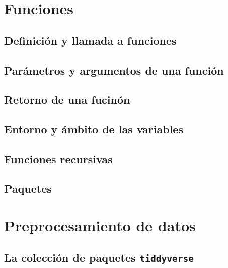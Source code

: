 \documentclass[
]{book}
\theoremstyle{definition}
\theoremstyle{definition}
\theoremstyle{definition}
\theoremstyle{definition}
\theoremstyle{remark}
\begin{document}
\hypertarget{funciones}{%
\chapter{Funciones}\label{funciones}}

\hypertarget{definiciuxf3n-y-llamada-a-funciones}{%
\section{Definición y llamada a funciones}\label{definiciuxf3n-y-llamada-a-funciones}}

\hypertarget{paruxe1metros-y-argumentos-de-una-funciuxf3n}{%
\section{Parámetros y argumentos de una función}\label{paruxe1metros-y-argumentos-de-una-funciuxf3n}}

\hypertarget{retorno-de-una-fucinuxf3n}{%
\section{Retorno de una fucinón}\label{retorno-de-una-fucinuxf3n}}

\hypertarget{entorno-y-uxe1mbito-de-las-variables}{%
\section{Entorno y ámbito de las variables}\label{entorno-y-uxe1mbito-de-las-variables}}

\hypertarget{funciones-recursivas}{%
\section{Funciones recursivas}\label{funciones-recursivas}}

\hypertarget{paquetes}{%
\section{Paquetes}\label{paquetes}}

\hypertarget{preprocesamiento-de-datos}{%
\chapter{Preprocesamiento de datos}\label{preprocesamiento-de-datos}}

\hypertarget{la-colecciuxf3n-de-paquetes-tiddyverse}{%
\section{\texorpdfstring{La colección de paquetes \texttt{tiddyverse}}{La colección de paquetes tiddyverse}}\label{la-colecciuxf3n-de-paquetes-tiddyverse}}
\end{document}
